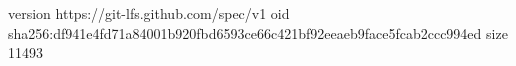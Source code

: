version https://git-lfs.github.com/spec/v1
oid sha256:df941e4fd71a84001b920fbd6593ce66c421bf92eeaeb9face5fcab2ccc994ed
size 11493
